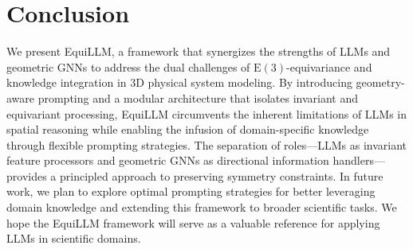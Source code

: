 \section{Conclusion}

We present EquiLLM, a framework that synergizes the strengths of LLMs and geometric GNNs to address the dual challenges of $\mathrm{E}(3)$-equivariance and knowledge integration in 3D physical system modeling. By introducing geometry-aware prompting and a modular architecture that isolates invariant and equivariant processing, EquiLLM circumvents the inherent limitations of LLMs in spatial reasoning while enabling the infusion of domain-specific knowledge through flexible prompting strategies. The separation of roles—LLMs as invariant feature processors and geometric GNNs as directional information handlers—provides a principled approach to preserving symmetry constraints. In future work, we plan to explore optimal prompting strategies for better leveraging domain knowledge and extending this framework to broader scientific tasks. We hope the EquiLLM framework will serve as a valuable reference for applying LLMs in scientific domains.
